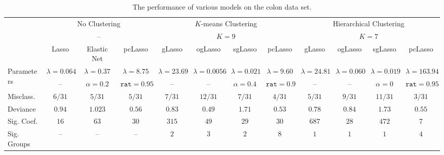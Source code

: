 \documentclass[10pt]{article}
\begin{document}
\begin{landscape}

\begin{table}[ht]
    \centering
    \def\arraystretch{1.5}
    \begin{tabularx}{0.97\linewidth}{lccccccccccc} \toprule
        & \multicolumn{3}{c}{No Clustering} & \multicolumn{4}{c}{$K$-means Clustering} & \multicolumn{4}{c}{Hierarchical Clustering} \\
        & \multicolumn{3}{c}{--} & \multicolumn{4}{c}{$K=9$} & \multicolumn{4}{c}{$K=7$} \\ \cmidrule(r){2-4} \cmidrule(lr){5-8} \cmidrule(l){9-12}
        & Lasso & Elastic Net & pcLasso & gLasso & ogLasso & sgLasso & pcLasso & gLasso & ogLasso & sgLasso & pcLasso \\ \midrule
        \multirow{2}{*}{Parameters} & $\lambda =  0.064$ & $\lambda = 0.37$ & $\lambda = 8.75$ & $\lambda = 23.69$ & $\lambda = 0.0056$ & $\lambda = 0.021$ & $\lambda = 9.60$ & $\lambda = 24.81$ & $\lambda = 0.060$ & $\lambda = 0.019$ & $\lambda = 163.94$ \\
         & -- & $\alpha = 0.2$ & $\texttt{rat} = 0.95$ & -- & -- & $\alpha = 0.4$ & $\texttt{rat} = 0.9$ & -- & -- & $\alpha = 0$ & $\texttt{rat} = 0.95$ \\
        Misclass. & $6/31$ & $5/31$ & $5/31$ & $7/31$ & $12/31$ & $7/31$ & $4/31$ & $5/31$ & $9/31$ & $11/31$ & $3/31$ \\
        Deviance & $0.94$ & $1.023$ & $0.56$ & $0.83$ & $0.49$ & $1.71$ & $0.53$ & $0.78$ & $0.84$ & $1.73$ & $0.55$ \\
        Sig. Coef. & $16$ & $63$ & $30$ & $315$ & $49$ & $29$ & $30$ & $687$ & $28$ & $472$ & $7$ \\
        Sig. Groups & -- & -- & -- & $2$ & $3$ & $2$ & $8$ & $1$ & $1$ & $1$ & $4$ \\ \bottomrule
    \end{tabularx}
    \caption{The performance of various models on the colon data set.}
    \label{colontablenew}
    

\end{table}
\end{landscape}
\end{document}
